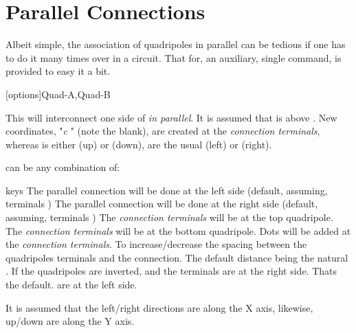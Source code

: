 \documentclass[10pt]{article}
\begin{document}
\section{Parallel Connections}\label{Parallel Conn}
Albeit simple, the association of quadripoles in parallel can be tedious if one has to do it many times over in a circuit. That for, an auxiliary, single command, is provided to easy it a bit.

\begin{codedescribe}[code,new=2025/03/07]{\QuadParConnect}
\begin{codesyntax}%
\tsmacro{\QuadParConnect}[options]{Quad-A,Quad-B}
\end{codesyntax}
This will interconnect one side of  \emph{in parallel}. It is assumed that  is above . New coordinates, "\emph{c} " (note the blank),  are created at the \emph{connection terminals}, whereas  is either  (up) or  (down),  are the usual  (left) or  (right).
\end{codedescribe}
 can be any combination of:
\begin{describelist*}[30mm]{keys}
    {The parallel connection will be done at the left side (default, assuming, terminals )}
    {The parallel connection will be done at the right side (default, assuming, terminals )}
   {The \emph{connection terminals} will be at the top quadripole.}
   {The \emph{connection terminals} will be at the bottom quadripole.}
   {Dots will be added at the \emph{connection terminals}.}
    {To increase/decrease the spacing between the quadripoles terminals and the connection. The default distance being the natural .}
     {If the quadripoles are inverted, and the terminals  are at the right side.}
    {Thats the default.  are at the left side.}
\end{describelist*}

\begin{tsremark}
It is assumed that the left/right directions are along the X axis, likewise, up/down are along the Y axis.
\end{tsremark}
\end{document}
